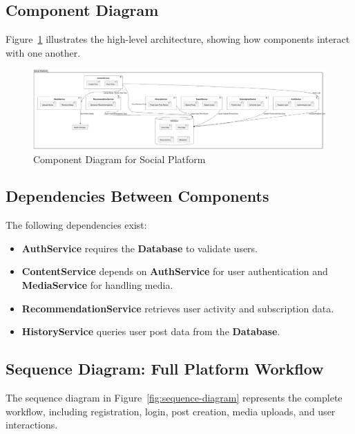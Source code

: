 \documentclass[a4paper,12pt]{article}
\begin{document}
\subsection{Component Diagram}

Figure~\ref{fig:component-diagram} illustrates the high-level architecture, showing how components interact with one another.

\begin{figure}[H]
    \centering
    \includegraphics[width=1\linewidth]{UML_component.png}
    \caption{Component Diagram for Social Platform}
    \label{fig:component-diagram}
\end{figure}

\subsection{Dependencies Between Components}

The following dependencies exist:

\begin{itemize}
    \item \textbf{AuthService} requires the \textbf{Database} to validate users.
    \item \textbf{ContentService} depends on \textbf{AuthService} for user authentication and \textbf{MediaService} for handling media.
    \item \textbf{RecommendationService} retrieves user activity and subscription data.
    \item \textbf{HistoryService} queries user post data from the \textbf{Database}.
\end{itemize}

\subsection{Sequence Diagram: Full Platform Workflow}

The sequence diagram in Figure~\ref{fig:sequence-diagram} represents the complete workflow, including registration, login, post creation, media uploads, and user interactions.
\end{document}
